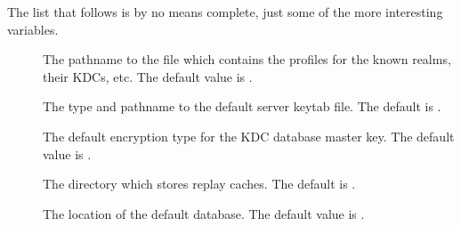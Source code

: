 \documentclass[letterpaper,10pt,english]{sphinxmanual}
\begin{document}
\begin{sphinxVerbatim}[commandchars=\\\{\}]
\end{sphinxVerbatim}

\sphinxAtStartPar
The list that follows is by no means complete, just some of the more
interesting variables.
\begin{description}
\item[{}] \leavevmode
\sphinxAtStartPar
The pathname to the file which contains the profiles for the known
realms, their KDCs, etc. The default value is .

\item[{}] \leavevmode
\sphinxAtStartPar
The type and pathname to the default server keytab file.  The
default is .

\item[{}] \leavevmode
\sphinxAtStartPar
The default encryption type for the KDC database master key.  The
default value is .

\item[{}] \leavevmode
\sphinxAtStartPar
The directory which stores replay caches.  The default is
.

\item[{}] \leavevmode
\sphinxAtStartPar
The location of the default database.  The default value is
.

\end{description}



\renewcommand{\indexname}{Index}
\printindex
\end{document}
